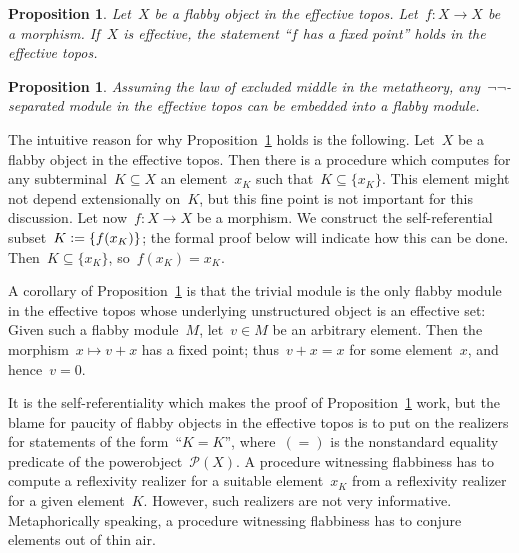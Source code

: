 \documentclass[oneside]{amsart}
\theoremstyle{definition}
\theoremstyle{plain}
\newtheorem{prop}[defn]{Proposition}
\theoremstyle{remark}
\renewcommand{\P}{\mathcal{P}}
\newcommand{\defeq}{\vcentcolon=}
\renewcommand{\_}{\mathpunct{.}\,}
\begin{document}
\begin{prop}\label{prop:flabby-effective-sets}
Let~$X$ be a flabby object in the effective topos. Let~$f : X \to X$
be a morphism. If~$X$ is effective, the statement ``$f$ has a fixed point''
holds in the effective topos.
\end{prop}

\begin{prop}\label{prop:semienough-flabby-modules}
Assuming the law of excluded middle in the metatheory, any~$\neg\neg$-separated
module in the effective topos can be embedded into a flabby module.
\end{prop}




The intuitive
reason for why Proposition~\ref{prop:flabby-effective-sets} holds is the
following. Let~$X$ be a flabby object in the effective topos. Then there is a
procedure which computes for any subterminal~$K \subseteq X$ an element~$x_K$
such that~$K \subseteq \{ x_K \}$. This element might not depend extensionally
on~$K$, but this fine point is not important for this discussion. Let
now~$f : X \to X$ be a morphism. We construct the self-referential subset~$K
\defeq \{ f(x_K) \}$; the formal proof below will indicate how this can be
done. Then~$K \subseteq \{ x_K \}$, so~$f(x_K) = x_K$.

A corollary of Proposition~\ref{prop:flabby-effective-sets} is that the trivial
module is the only flabby module in the effective topos whose underlying
unstructured object is an effective set: Given such a flabby module~$M$, let~$v
\in M$ be an arbitrary element. Then the morphism~$x \mapsto v + x$ has a fixed
point; thus~$v + x = x$ for some element~$x$, and hence~$v = 0$.

It is the self-referentiality which makes the proof of
Proposition~\ref{prop:flabby-effective-sets} work, but the blame for paucity
of flabby objects in the effective topos is to put on the realizers for
statements of the form~``$K = K$'', where~$({=})$ is the nonstandard equality
predicate of the powerobject~$\P(X)$. A procedure witnessing flabbiness has to
compute a reflexivity realizer for a suitable element~$x_K$ from a reflexivity
realizer for a given element~$K$. However, such realizers are not very
informative. Metaphorically speaking, a procedure witnessing flabbiness has to
conjure elements out of thin air.
\end{document}
